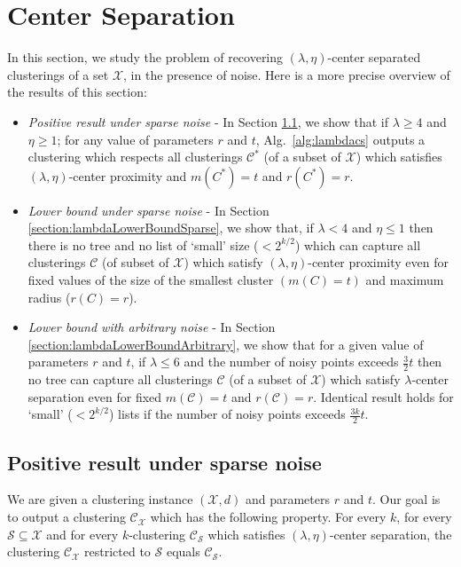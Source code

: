 \documentclass[letterpaper,12pt,titlepage,oneside,final]{book}
\newcommand{\mc}{\mathcal}
\begin{document}
\section{Center Separation}
In this section, we study the problem of recovering $(\lambda, \eta)$-center separated clusterings of a set $\mc X$, in the presence of noise. Here is a more precise overview of the results of this section:
\begin{itemize}
\item  {\it Positive result under sparse noise} - In Section \ref{section:lambdaPositiveResultSparseNoise}, we show that if $\lambda \ge 4$ and $\eta \ge 1$; for any value of parameters $r$ and $t$, Alg.~\ref{alg:lambdacs} outputs a clustering which respects all clusterings $\mc C^*$ (of a subset of $\mc X$) which satisfies $(\lambda, \eta)$-center proximity and $m(C^*)=t$ and $r(C^*) = r$.
\item  {\it Lower bound under sparse noise} - In Section \ref{section:lambdaLowerBoundSparse}, we show that, if $\lambda < 4$ and $\eta \le 1$ then there is no tree and no list of `small' size ($<2^{k/2}$) which can capture all clusterings $\mc C$ (of subset of $\mc X$) which satisfy $(\lambda, \eta)$-center proximity even for fixed values of the size of the smallest cluster $(m(C) = t)$ and maximum radius ($r(C) = r$).
\item {\it Lower bound with arbitrary noise} - In Section \ref{section:lambdaLowerBoundArbitrary}, we show that for a given value of parameters $r$ and $t$, if $\lambda \le 6$ and the number of noisy points exceeds $\frac{3}{2}t$ then no tree can capture all clusterings $\mc C$ (of a subset of $\mc X$) which satisfy $\lambda$-center separation even for fixed $m(\mc C) = t$ and $r(\mc C) = r$. Identical result holds for `small' ($<2^{k/2}$) lists if the number of noisy points exceeds $\frac{3k}{2}t$.
\end{itemize}

\subsection{Positive result under sparse noise}
\label{section:lambdaPositiveResultSparseNoise}
We are given a clustering instance $(\mc X, d)$ and parameters $r$ and $t$. Our goal is to output a clustering $\mc C_{\mc X}$ which has the following property. For every $k$, for every $\mc S \subseteq \mc X$ and for every $k$-clustering $\mc C_{\mc S}$ which satisfies $(\lambda, \eta)$-center separation, the clustering $\mc C_{\mc X}$ restricted to $\mc S$ equals $\mc C_{\mc S}$. 
\end{document}
